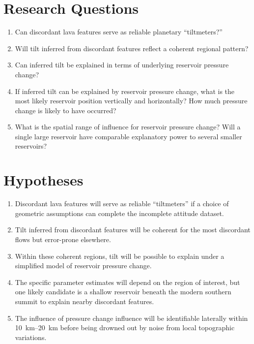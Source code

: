 \section{Research Questions}

\begin{enumerate}
    \item Can discordant lava features serve as reliable planetary ``tiltmeters?''
    \item Will tilt inferred from discordant features reflect a coherent regional pattern?
    \item Can inferred tilt be explained in terms of underlying reservoir pressure change?
    \item If inferred tilt can be explained by reservoir pressure change, what is the most likely reservoir position vertically and horizontally? How much pressure change is likely to have occurred?
    \item What is the spatial range of influence for reservoir pressure change? Will a single large reservoir have comparable explanatory power to several smaller reservoirs? 
\end{enumerate}

\section{Hypotheses}

\begin{enumerate}
    \item Discordant lava features will serve as reliable ``tiltmeters'' if a choice of geometric assumptions can complete the incomplete attitude dataset.
    \item Tilt inferred from discordant features will be coherent for the most discordant flows but error-prone elsewhere.
    \item Within these coherent regions, tilt will be possible to explain under a simplified model of reservoir pressure change.  
    \item The specific parameter estimates will depend on the region of interest, but one likely candidate is a shallow reservoir beneath the modern southern summit to explain nearby discordant features.
    \item The influence of pressure change influence will be identifiable laterally within \qtyrange{10}{20}{\km} before being drowned out by noise from local topographic variations.
\end{enumerate}